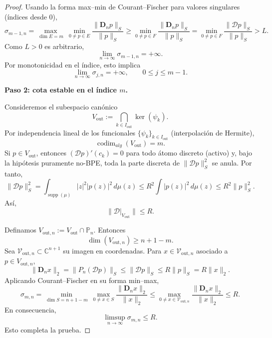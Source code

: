 \begin{proof}
	Usando la forma max--min de Courant--Fischer para valores singulares (índices desde $0$),
	\[
		\sigma_{m-1,n}
		=
		\max_{\dim E=m}\ \min_{0\ne p\in E}\frac{\|\mathbf D_np\|_S}{\|p\|_S}
		\ge
		\min_{0\ne p\in F}\frac{\|\mathbf D_np\|_S}{\|p\|_S}
		=
		\min_{0\ne p\in F}\frac{\|\mathcal Dp\|_S}{\|p\|_S}
		> L.
	\]
	Como $L>0$ es arbitrario,
	\[
		\lim_{n\to\infty}\sigma_{m-1,n}=+\infty.
	\]
	Por monotonicidad en el índice, esto implica
	\[
		\lim_{n\to\infty}\sigma_{j,n}=+\infty,
		\qquad 0\le j\le m-1.
	\]

	\medskip
	\noindent
	\textbf{Paso 2: cota estable en el índice $m$.}

	Consideremos el subespacio canónico
	\[
		V_{\mathrm{out}}:=\bigcap_{k\in I_{\mathrm{out}}}\ker(\psi_k).
	\]
	Por independencia lineal de los funcionales $\{\psi_k\}_{k\in I_{\mathrm{out}}}$
	(interpolación de Hermite),
	\[
		\operatorname{codim}_{alg}(V_{\mathrm{out}})=m.
	\]
	Si $p\in V_{\mathrm{out}}$, entonces $(\mathcal Dp)'(c_k)=0$ para todo átomo discreto
	(activo) y, bajo la hipótesis puramente no-BPE, toda la parte discreta de
	$\|\mathcal Dp\|_S^2$ se anula. Por tanto,
	\[
		\|\mathcal Dp\|_S^2
		=
		\int_{\operatorname{supp}(\mu)}|z|^2|p(z)|^2\,d\mu(z)
		\le
		R^2\int |p(z)|^2\,d\mu(z)
		\le
		R^2\|p\|_S^2.
	\]
	Así,
	\[
		\|\mathcal D|_{V_{\mathrm{out}}}\|\le R.
	\]

	Definamos $V_{\mathrm{out},n}:=V_{\mathrm{out}}\cap\mathbb P_n$. Entonces
	\[
		\dim(V_{\mathrm{out},n})\ge n+1-m.
	\]
	Sea $\mathcal V_{\mathrm{out},n}\subset\mathbb C^{n+1}$ su imagen en coordenadas.
	Para $x\in\mathcal V_{\mathrm{out},n}$ asociado a $p\in V_{\mathrm{out},n}$,
	\[
		\|\mathbf D_nx\|_2
		=
		\|P_n(\mathcal Dp)\|_S
		\le
		\|\mathcal Dp\|_S
		\le
		R\|p\|_S
		=
		R\|x\|_2.
	\]
	Aplicando Courant--Fischer en su forma min--max,
	\[
		\sigma_{m,n}
		=
		\min_{\dim S=n+1-m}\ \max_{0\ne x\in S}\frac{\|\mathbf D_nx\|_2}{\|x\|_2}
		\le
		\max_{0\ne x\in\mathcal V_{\mathrm{out},n}}\frac{\|\mathbf D_nx\|_2}{\|x\|_2}
		\le R.
	\]
	En consecuencia,
	\[
		\limsup_{n\to\infty}\sigma_{m,n}\le R.
	\]
	Esto completa la prueba.
\end{proof}